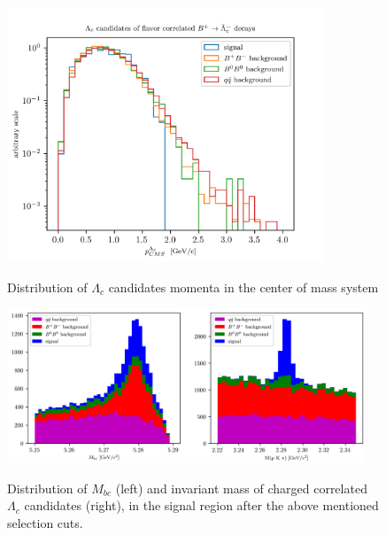 \newpage

\begin{figure}[h!]
{\includegraphics[width=0.85\textwidth]{04-chargedCorrBtoLambda/figs/LogPlotchargedBcorr_Lambda_c_CMS_P_optimisedSigProb_R.png}}
\caption{Distribution of  $\Lambda_c$ candidates momenta in the center of mass system}
\label{fig:LogPlotchargedBcorr_Lambda_c_CMS_P_optimisedSigProb_R}
\end{figure}

\begin{figure}[h!]
{\includegraphics[width=0.95\textwidth]{04-chargedCorrBtoLambda/figs/Mbc_InvM_optimizedSelection_SigR.png}}
\caption{Distribution of $M_{bc} $ (left) and invariant mass of charged correlated $\Lambda_c$  candidates (right), in the signal region after the above mentioned selection cuts.}
\label{fig:Mbc_InvM_optimizedSelection_SigR}
\end{figure}

